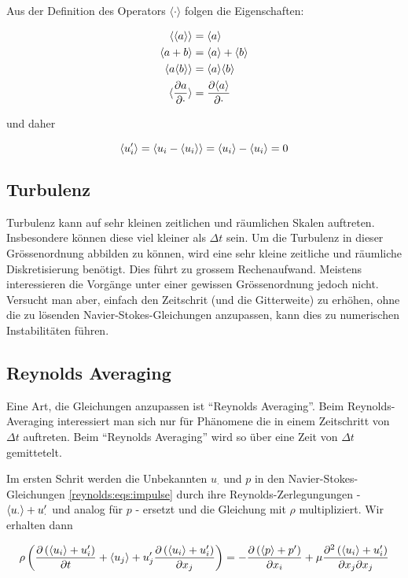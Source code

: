 Aus der Definition des Operators $\langle \cdot \rangle$ folgen die Eigenschaften:

\begin{align}
    \langle \langle a \rangle \rangle &= \langle a \rangle \\
    \langle a + b \rangle &= \langle a \rangle + \langle b \rangle \\
    \langle a \langle b \rangle \rangle &= \langle a \rangle \langle b \rangle \\
    \langle \frac{\partial a}{\partial \cdot} \rangle &= \frac{\partial \langle a \rangle}{\partial \cdot}
\end{align}

und daher

\begin{equation}
    \label{reynolds:eqs:trans-cancel}
    \langle u_i' \rangle = \langle u_i - \langle u_i \rangle \rangle = \langle u_i \rangle - \langle u_i \rangle = 0
\end{equation}

\subsection{Turbulenz}

Turbulenz kann auf sehr kleinen zeitlichen und räumlichen Skalen auftreten.
Insbesondere können diese viel kleiner als $\Delta t$ sein. Um die Turbulenz in dieser
Grössenordnung abbilden zu können, wird eine sehr kleine zeitliche und räumliche Diskretisierung
benötigt. Dies führt zu grossem Rechenaufwand. Meistens interessieren die Vorgänge unter
einer gewissen Grössenordnung jedoch nicht. Versucht man aber, einfach den Zeitschrit
(und die Gitterweite) zu erhöhen, ohne die zu lösenden Navier-Stokes-Gleichungen
anzupassen, kann dies zu numerischen Instabilitäten führen.

\subsection{Reynolds Averaging}
Eine Art, die Gleichungen anzupassen ist ``Reynolds Averaging''. Beim Reynolds-Averaging
interessiert man sich nur für Phänomene die in einem Zeitschritt von $\Delta t$ auftreten.
Beim ``Reynolds Averaging'' wird so über eine Zeit von $\Delta t$ gemittetelt.

Im ersten Schrit werden die Unbekannten $u_\cdot$ und $p$ in den Navier-Stokes-Gleichungen \ref{reynolds:eqs:impulse}
durch ihre Reynolds-Zerlegungungen - $\langle u_\cdot \rangle + u_\cdot'$ und analog für $p$ - ersetzt und die Gleichung
mit $\rho$ multipliziert. Wir erhalten dann

\begin{equation}
    \label{reynolds:eqs:der1}
    \rho \left( \frac{\partial \left( \langle u_i \rangle + u_i' \right)}{\partial t} + \langle u_j \rangle + u_j' \frac{\partial \left( \langle u_i \rangle + u_i' \right)}{\partial x_j} \right) =
        - \frac{\partial \left( \langle p \rangle + p' \right)}{\partial x_i} + 
        \mu \frac{\partial^2 \left( \langle u_i \rangle + u_i' \right)}{\partial x_j \partial x_j}
\end{equation}

